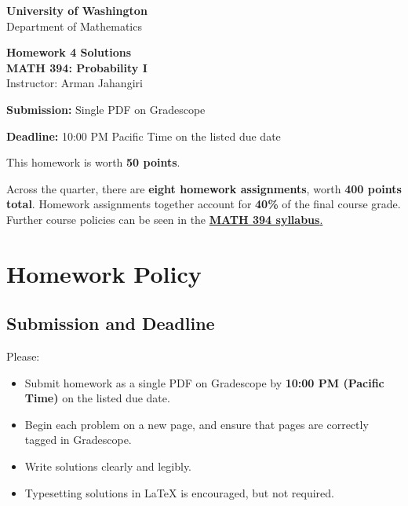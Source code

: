 \documentclass[11pt]{article}
\newcommand{\course}{MATH 394: Probability I}
\newcommand{\department}{Department of Mathematics}
\newcommand{\university}{University of Washington}
\begin{document}
\begin{titlepage}
\centering
\vspace*{1.2cm}

{\Large \textbf{\university}}\\
{\large \department}

\vspace{1.5cm}

{\Huge \color{uwpurple}\textbf{Homework 4 Solutions}}\\[0.25cm]
{\Large \textbf{\course}}\\[0.25cm]
{\large Instructor: Arman Jahangiri}

\vspace{1cm}

\begin{tcolorbox}[
    width=0.78\textwidth,
    colback=softpurple,
    colframe=uwpurple,
    boxrule=0.9pt,
    arc=3mm
]
\centering
\textbf{Submission:} Single PDF on Gradescope

\textbf{Deadline:} 10:00 PM Pacific Time on the listed due date
\end{tcolorbox}

\vspace{0.8cm}

\begin{tcolorbox}[
    width=0.86\textwidth,
    colback=white,
    colframe=uwgold,
    boxrule=0.8pt,
    arc=3mm
]
This homework is worth \textbf{50 points}.

Across the quarter, there are \textbf{eight homework assignments}, worth \textbf{400 points total}. Homework assignments together account for \textbf{40\%} of the final course grade. Further course policies can be seen in the \href{https://armanjg.github.io/MATH-394-Probability-1-v2/}{\textbf{MATH 394 syllabus}.}
\end{tcolorbox}

\vfill
\end{titlepage}

\section*{Homework Policy}

\subsection*{Submission and Deadline}

Please:

\begin{itemize}[leftmargin=*]
    \item Submit homework as a single PDF on Gradescope by \textbf{10:00 PM (Pacific Time)} on the listed due date.
    \item Begin each problem on a new page, and ensure that pages are correctly tagged in Gradescope.
    \item Write solutions clearly and legibly.
    \item Typesetting solutions in LaTeX is encouraged, but not required.
\end{itemize}
\end{document}
